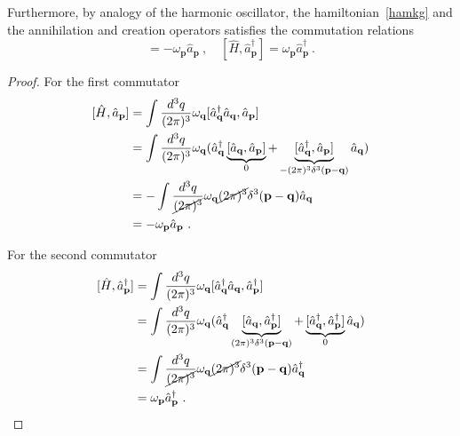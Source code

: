     Furthermore, by analogy of the harmonic oscillator, the hamiltonian~\eqref{hamkg} and the annihilation and creation operators satisfies the commutation relations 
    \begin{equation*}
        [\hat H, \hat a_{\mathbf p}] = - \omega_{\mathbf p} \hat a_{\mathbf p} ~, \quad [\hat H, \hat a_{\mathbf p}^\dagger] = \omega_{\mathbf p} \hat a_{\mathbf p}^\dagger ~.
    \end{equation*}
    \begin{proof}
        For the first commutator
        \begin{equation*}
        \begin{aligned}
            [\hat H, \hat a_{\mathbf p}] & = \int \frac{d^3 q}{(2\pi)^3} \omega_{\mathbf q} [\hat a_{\mathbf q}^\dagger \hat a_{\mathbf q}, \hat a_{\mathbf p}] \\ & = \int \frac{d^3 q}{(2\pi)^3} \omega_{\mathbf q} (\hat a_{\mathbf q}^\dagger \underbrace{[\hat a_{\mathbf q}, \hat a_{\mathbf p}]}_0 + \underbrace{[\hat a_{\mathbf q}^\dagger, \hat a_{\mathbf p}]}_{- (2\pi)^3 \delta^3 (\mathbf p - \mathbf q)} \hat a_{\mathbf q}) \\ & = - \int \frac{d^3 q}{\cancel{(2\pi)^3}} \omega_{\mathbf q} \cancel{(2\pi)^3} \delta^3 (\mathbf p - \mathbf q) \hat a_{\mathbf q} \\ & = - \omega_{\mathbf p} \hat a_{\mathbf p} ~.
        \end{aligned}
        \end{equation*}

        For the second commutator
        \begin{equation*}
        \begin{aligned}
            [\hat H, \hat a_{\mathbf p}^\dagger] & = \int \frac{d^3 q}{(2\pi)^3} \omega_{\mathbf q} [\hat a_{\mathbf q}^\dagger \hat a_{\mathbf q}, \hat a_{\mathbf p}^\dagger] \\ & = \int \frac{d^3 q}{(2\pi)^3} \omega_{\mathbf q} (\hat a_{\mathbf q}^\dagger \underbrace{[\hat a_{\mathbf q}, \hat a_{\mathbf p}^\dagger]}_ {(2\pi)^3 \delta^3 (\mathbf p - \mathbf q)} + \underbrace{[\hat a_{\mathbf q}^\dagger, \hat a_{\mathbf p}^\dagger]}_{0} \hat a_{\mathbf q}) \\ & = \int \frac{d^3 q}{\cancel{(2\pi)^3}} \omega_{\mathbf q} \cancel{(2\pi)^3} \delta^3 (\mathbf p - \mathbf q) \hat a_{\mathbf q}^\dagger \\ & = \omega_{\mathbf p} \hat a_{\mathbf p}^\dagger ~.
        \end{aligned}
        \end{equation*}
    \end{proof}

